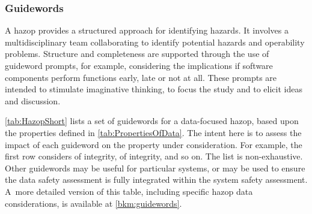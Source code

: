\subsubsection{ Guidewords}
\label{bkm:HazopGuidewords}
A \gls{hazop} \cite{citation:iec61882:2016}
provides a structured approach for identifying hazards. It involves a multidisciplinary team collaborating to identify potential hazards and operability problems. Structure and \gls{completeness} are supported through the use of guideword prompts, for example, considering the implications if software components perform functions early, late or not at all. These prompts are intended to stimulate imaginative thinking, to focus the study and to elicit ideas and discussion.

\autoref{tab:HazopShort} lists a set of guidewords for a data-focused \gls{hazop}, based upon the properties defined in \autoref{tab:PropertiesOfData}. The intent here is to assess the impact of each guideword on the property under consideration. For example, the first row considers  of \gls{integrity},  of \gls{integrity}, and so on.
The list is non-exhaustive. Other guidewords may be useful for particular systems, or may be used to ensure the data safety assessment is fully integrated within the system safety assessment. \cbstart A\cbend\ more detailed version of this table, including specific \gls{hazop} data considerations, is available at \autoref{bkm:guidewords}.

